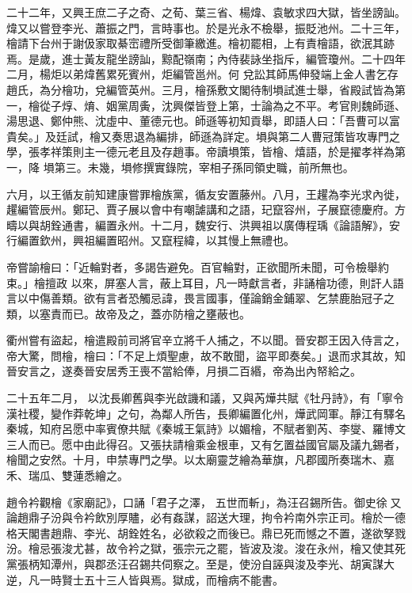 \begin{pinyinscope}
 二十二年，又興王庶二子之奇、之荀、葉三省、楊煒、袁敏求四大獄，皆坐謗訕。煒又以嘗登李光、蕭振之門，言時事也。於是光永不檢舉，振貶池州。二十三年，檜請下台州于謝伋家取綦崈禮所受御筆繳進。檜初罷相，上有責檜語，欲泯其跡焉。是歲，進士黃友龍坐謗訕，黥配嶺南；內侍裴詠坐指斥，編管瓊州。二十四年二月，楊炬以弟煒舊累死賓州，炬編管邕州。何
 兌訟其師馬伸發端上金人書乞存趙氏，為分檜功，兌編管英州。三月，檜孫敷文閣待制塤試進士舉，省殿試皆為第一，檜從子焞、焴、姻黨周夤，沈興傑皆登上第，士論為之不平。考官則魏師遜、湯思退、鄭仲熊、沈虛中、董德元也。師遜等初知貢舉，即語人曰：「吾曹可以富貴矣。」及廷試，檜又奏思退為編排，師遜為詳定。塤與第二人曹冠策皆攻專門之學，張孝祥策則主一德元老且及存趙事。帝讀塤策，皆檜、熺語，於是擢孝祥為第一，降
 塤第三。未幾，塤修撰實錄院，宰相子孫同領史職，前所無也。



 六月，以王循友前知建康嘗罪檜族黨，循友安置藤州。八月，王趯為李光求內徙，趯編管辰州。鄭玘、賈子展以會中有嘲謔講和之語，玘竄容州，子展竄德慶府。方疇以與胡銓通書，編置永州。十二月，魏安行、洪興祖以廣傳程瑀《論語解》，安行編置欽州，興祖編置昭州。又竄程緯，以其慢上無禮也。



 帝嘗諭檜曰：「近輪對者，多謁告避免。百官輪對，正欲聞所未聞，可令檢舉約束。」檜擅政
 以來，屏塞人言，蔽上耳目，凡一時獻言者，非誦檜功德，則訐人語言以中傷善類。欲有言者恐觸忌諱，畏言國事，僅論銷金鋪翠、乞禁鹿胎冠子之類，以塞責而已。故帝及之，蓋亦防檜之壅蔽也。



 衢州嘗有盜起，檜遣殿前司將官辛立將千人捕之，不以聞。晉安郡王因入侍言之，帝大驚，問檜，檜曰：「不足上煩聖慮，故不敢聞，盜平即奏矣。」退而求其故，知晉安言之，遂奏晉安居秀王喪不當給俸，月損二百緡，帝為出內帑給之。



 二十五年二月，
 以沈長卿舊與李光啟譏和議，又與芮燁共賦《牡丹詩》，有「寧令漢社稷，變作莽乾坤」之句，為鄰人所告，長卿編置化州，燁武岡軍。靜江有驛名秦城，知府呂愿中率賓僚共賦《秦城王氣詩》以媚檜，不賦者劉芮、李燮、羅博文三人而已。愿中由此得召。又張扶請檜乘金根車，又有乞置益國官屬及議九錫者，檜聞之安然。十月，申禁專門之學。以太廟靈芝繪為華旗，凡郡國所奏瑞木、嘉禾、瑞瓜、雙蓮悉繪之。



 趙令衿觀檜《家廟記》，口誦「君子之澤，
 五世而斬」，為汪召錫所告。御史徐𡕇又論趙鼎子汾與令衿飲別厚贐，必有姦謀，詔送大理，拘令衿南外宗正司。檜於一德格天閣書趙鼎、李光、胡銓姓名，必欲殺之而後已。鼎已死而憾之不置，遂欲孥戮汾。檜忌張浚尤甚，故令衿之獄，張宗元之罷，皆波及浚。浚在永州，檜又使其死黨張柄知潭州，與郡丞汪召錫共伺察之。至是，使汾自誣與浚及李光、胡寅謀大逆，凡一時賢士五十三人皆與焉。獄成，而檜病不能書。




\end{pinyinscope}
